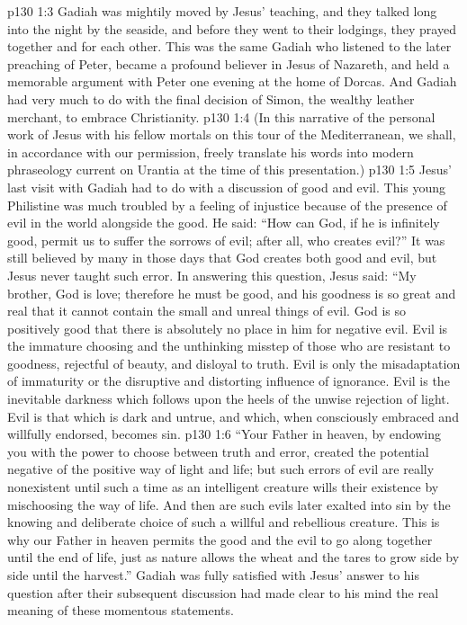 \vs p130 1:3 Gadiah was mightily moved by Jesus’ teaching, and they talked long into the night by the seaside, and before they went to their lodgings, they prayed together and for each other. This was the same Gadiah who listened to the later preaching of Peter, became a profound believer in Jesus of Nazareth, and held a memorable argument with Peter one evening at the home of Dorcas. And Gadiah had very much to do with the final decision of Simon, the wealthy leather merchant, to embrace Christianity.
\pc \vs p130 1:4 (In this narrative of the personal work of Jesus with his fellow mortals on this tour of the Mediterranean, we shall, in accordance with our permission, freely translate his words into modern phraseology current on Urantia at the time of this presentation.)
\pc \vs p130 1:5 Jesus’ last visit with Gadiah had to do with a discussion of good and evil. This young Philistine was much troubled by a feeling of injustice because of the presence of evil in the world alongside the good. He said: “How can God, if he is infinitely good, permit us to suffer the sorrows of evil; after all, who creates evil?” It was still believed by many in those days that God creates both good and evil, but Jesus never taught such error. In answering this question, Jesus said: \textcolor{ubdarkred}{“My brother, God is love; therefore he must be good, and his goodness is so great and real that it cannot contain the small and unreal things of evil. God is so positively good that there is absolutely no place in him for negative evil. Evil is the immature choosing and the unthinking misstep of those who are resistant to goodness, rejectful of beauty, and disloyal to truth. Evil is only the misadaptation of immaturity or the disruptive and distorting influence of ignorance. Evil is the inevitable darkness which follows upon the heels of the unwise rejection of light. Evil is that which is dark and untrue, and which, when consciously embraced and willfully endorsed, becomes sin.}
\vs p130 1:6 \textcolor{ubdarkred}{“Your Father in heaven, by endowing you with the power to choose between truth and error, created the potential negative of the positive way of light and life; but such errors of evil are really nonexistent until such a time as an intelligent creature wills their existence by mischoosing the way of life. And then are such evils later exalted into sin by the knowing and deliberate choice of such a willful and rebellious creature. This is why our Father in heaven permits the good and the evil to go along together until the end of life, just as nature allows the wheat and the tares to grow side by side until the harvest.”} Gadiah was fully satisfied with Jesus’ answer to his question after their subsequent discussion had made clear to his mind the real meaning of these momentous statements.
